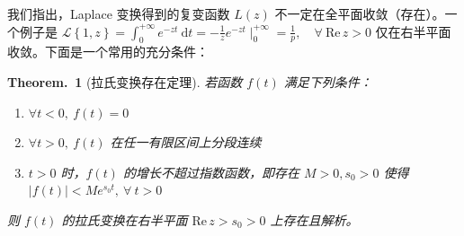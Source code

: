 \documentclass[UTF8]{report}
\def\Re{\mathrm{Re\,}}
\theoremstyle{MyLineTheoremStyle} %
\theoremstyle{MyBlockTheoremStyle} %
\newtheorem{BlockTheorem}[LineTheorem]{Theorem.\,} %
\theoremstyle{MySubsubsectionStyle} %
\begin{document}
我们指出，Laplace 变换得到的复变函数 $L(z)$ 不一定在全平面收敛（存在）。一个例子是 $ \mathscr{L}\left\{ 1, z \right\} = \int_{0}^{+\infty} e^{-zt} \ \mathrm{d}t = - \frac{1}{z} e^{-zt}\mid_0^{+\infty} = \frac{1}{p},\quad \forall\ \Re z > 0$ 仅在右半平面收敛。下面是一个常用的充分条件：
\begin{BlockTheorem}[拉氏变换存在定理]\label{拉氏变换存在定理}
\hspace*{-3em} 若函数 $f(t)$ 满足下列条件：
\begin{enumerate}
\item $\forall t < 0,\ f(t) = 0$ 
\item $\forall t > 0,\ f(t)$ 在任一有限区间上分段连续
\item $t > 0$ 时，$f(t)$ 的增长不超过指数函数，即存在 $M>0, s_0 >0$ 使得 $| f(t) | < M e^{s_0 t},\ \forall\  t > 0$
\end{enumerate}
则 $f(t)$ 的拉氏变换在右半平面 $\Re z > s_0 > 0$ 上存在且解析。
\end{BlockTheorem}
\end{document}
